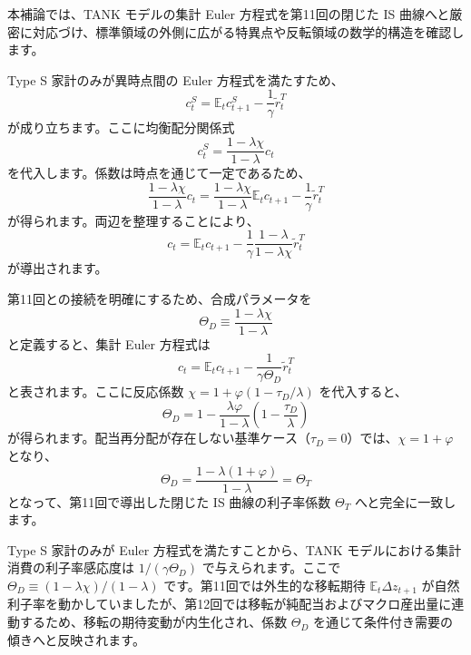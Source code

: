 \documentclass[
  japanese,
  lualatex,
  ja=standard,
  12pt,
  a4paper]{ltjsarticle}
\begin{document}
本補論では、TANK モデルの集計 Euler 方程式を第11回の閉じた IS
曲線へと厳密に対応づけ、標準領域の外側に広がる特異点や反転領域の数学的構造を確認します。

Type S 家計のみが異時点間の Euler 方程式を満たすため、 \[
c_t^S = \mathbb{E}_t c_{t+1}^S - \frac{1}{\gamma}\widetilde{r}_t^T
\] が成り立ちます。ここに均衡配分関係式 \[
c_t^S = \frac{1 - \lambda\chi}{1-\lambda} c_t
\] を代入します。係数は時点を通じて一定であるため、 \[
\frac{1 - \lambda\chi}{1-\lambda} c_t = \frac{1 - \lambda\chi}{1-\lambda} \mathbb{E}_t c_{t+1} - \frac{1}{\gamma}\widetilde{r}_t^T
\] が得られます。両辺を整理することにより、 \[
c_t = \mathbb{E}_t c_{t+1} - \frac{1}{\gamma} \frac{1-\lambda}{1-\lambda\chi}\widetilde{r}_t^T
\] が導出されます。

第11回との接続を明確にするため、合成パラメータを \[
\Theta_D \equiv \frac{1 - \lambda\chi}{1-\lambda}
\] と定義すると、集計 Euler 方程式は \[
c_t = \mathbb{E}_t c_{t+1} - \frac{1}{\gamma \Theta_D}\widetilde{r}_t^T
\] と表されます。ここに反応係数
\(\chi = 1 + \varphi(1 - \tau_D/\lambda)\) を代入すると、 \[
\Theta_D = 1 - \frac{\lambda\varphi}{1-\lambda}\left( 1 - \frac{\tau_D}{\lambda} \right)
\]
が得られます。配当再分配が存在しない基準ケース（\(\tau_D = 0\)）では、\(\chi = 1+\varphi\)
となり、 \[
\Theta_D = \frac{1 - \lambda(1+\varphi)}{1-\lambda} = \Theta_T
\] となって、第11回で導出した閉じた IS 曲線の利子率係数 \(\Theta_T\)
へと完全に一致します。


\begin{tcolorbox}[enhanced jigsaw, arc=.35mm, bottomrule=.15mm, bottomtitle=1mm, breakable, colback=white, colbacktitle=quarto-callout-note-color!10!white, colframe=quarto-callout-note-color-frame, coltitle=black, left=2mm, leftrule=.75mm, opacityback=0, opacitybacktitle=0.6, rightrule=.15mm, title=\textcolor{quarto-callout-note-color}{\faInfo}\hspace{0.5em}{集計 Euler 方程式の要点}, titlerule=0mm, toprule=.15mm, toptitle=1mm]

Type S 家計のみが Euler 方程式を満たすことから、TANK
モデルにおける集計消費の利子率感応度は \(1/(\gamma \Theta_D)\)
で与えられます。ここで \(\Theta_D \equiv (1 - \lambda\chi)/(1-\lambda)\)
です。第11回では外生的な移転期待 \(\mathbb{E}_t \Delta z_{t+1}\)
が自然利子率を動かしていましたが、第12回では移転が純配当およびマクロ産出量に連動するため、移転の期待変動が内生化され、係数
\(\Theta_D\) を通じて条件付き需要の傾きへと反映されます。

\end{tcolorbox}
\end{document}

